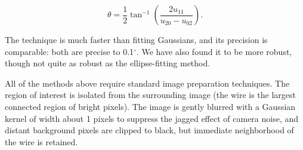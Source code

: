 \begin{equation}
\theta = \frac{1}{2}\tan^{-1}\left(\frac{2u_{11}}{u_{20} - u_{02}}\right).
\end{equation}

\noindent The technique is much faster than fitting Gaussians, and its precision is comparable: both are precise to 0.1$^\circ$. We have also found it to be more robust, though not quite as robust as the ellipse-fitting method.

All of the methods above require standard image preparation techniques. The region of interest is isolated from the surrounding image (the wire is the largest connected region of bright pixels). The image is gently blurred with a Gaussian kernel of width about 1 pixels to suppress the jagged effect of camera noise, and distant background pixels are clipped to black, but immediate neighborhood of the wire is retained.